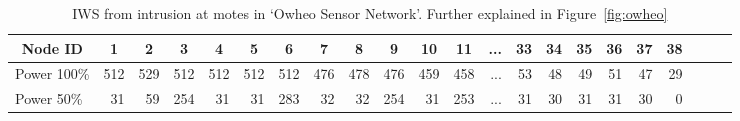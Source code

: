 \documentclass[conference,manuscript]{IEEEtran}
\newcommand*{\bd}[1]{\multicolumn{1}{|c}{\bfseries #1}}
\begin{document}
\begin{table}[t!]
\centering
\begin{tabular}{|l|*{20}{r|}r|}
\hline
\bd{Node ID}           & \bd{1} & \bd{2} & \bd{3} & \bd{4} & \bd{5} & \bd{6} & \bd{7} & \bd{8} & \bd{9} & \bd{10} & \bd{11} & \bd{...} & \bd{33} & \bd{34} & \bd{35} & \bd{36} & \bd{37} & \bd{38} \\
\hline		\hline

Power 100\%	   & 512 & 529 & 512 & 512 & 512  & 512 & 476 & 478 & 476 & 459 & 458 & ...& 53  & 48 & 49 & 51 & 47 & 29 \\
\hline

Power 50\%	  &31 & 59&254& 31& 31 &283& 32& 32& 254& 31 &253 & ... & 31  & 30 & 31 & 31 & 30 & 0 \\
\hline
\end{tabular}
\caption{IWS from intrusion at motes in `Owheo Sensor Network'. Further explained in Figure~\ref{fig:owheo}}
\label{tab:owheo}
\end{table}
\end{document}
